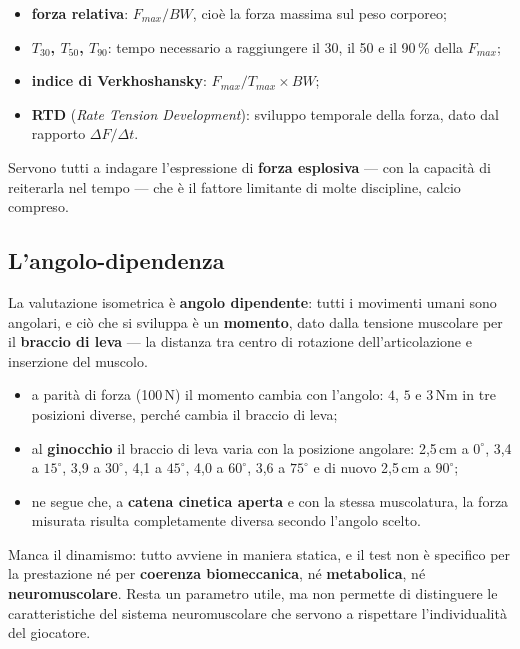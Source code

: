 \begin{itemize}
  \item \textbf{forza relativa}: $F_{max}/BW$, cioè la forza massima sul peso corporeo;
  \item \textbf{$T_{30}$, $T_{50}$, $T_{90}$}: tempo necessario a raggiungere il 30, il 50 e il
    90\,\% della $F_{max}$;
  \item \textbf{indice di Verkhoshansky}: $F_{max}/T_{max} \times BW$;
  \item \textbf{RTD} (\textit{Rate Tension Development}): sviluppo temporale della forza, dato dal
    rapporto $\Delta F / \Delta t$.
\end{itemize}
Servono tutti a indagare l'espressione di \textbf{forza esplosiva} --- con la capacità di reiterarla
nel tempo --- che è il fattore limitante di molte discipline, calcio compreso.

\subsection{L'angolo-dipendenza}

La valutazione isometrica è \textbf{angolo dipendente}: tutti i movimenti umani sono angolari, e ciò
  che si sviluppa è un \textbf{momento}, dato dalla tensione muscolare per il \textbf{braccio di
  leva} --- la distanza tra centro di rotazione dell'articolazione e inserzione del muscolo.

\begin{itemize}
  \item a parità di forza (100\,N) il momento cambia con l'angolo: $4$, $5$ e $3$\,Nm in
    tre posizioni diverse, perché cambia il braccio di leva;
  \item al \textbf{ginocchio} il braccio di leva varia con la posizione angolare: 2,5\,cm a
    $0^\circ$, 3,4 a $15^\circ$, 3,9 a $30^\circ$, 4,1 a $45^\circ$, 4,0 a $60^\circ$, 3,6 a
    $75^\circ$ e di nuovo 2,5\,cm a $90^\circ$;
  \item ne segue che, a \textbf{catena cinetica aperta} e con la stessa muscolatura, la forza
    misurata risulta completamente diversa secondo l'angolo scelto.
\end{itemize}

Manca il dinamismo: tutto avviene in maniera statica, e il test non è specifico per la prestazione
  né per \textbf{coerenza biomeccanica}, né \textbf{metabolica}, né \textbf{neuromuscolare}. Resta
  un parametro utile, ma non permette di distinguere le caratteristiche del sistema neuromuscolare
  che servono a rispettare l'individualità del giocatore.

